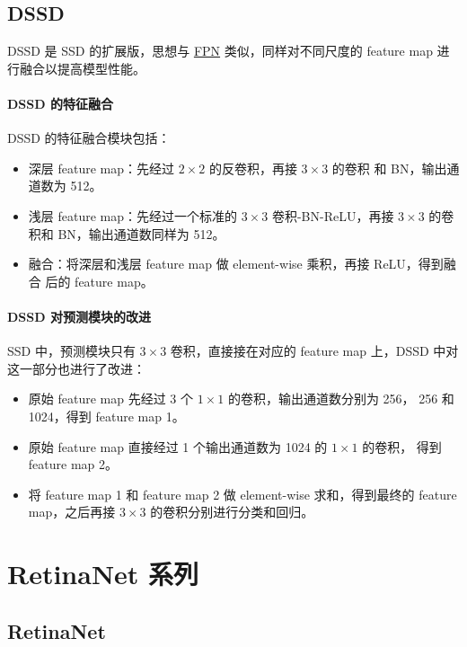 \subsection{DSSD}
\label{subsec:DSSD}

DSSD 是 SSD 的扩展版，思想与 \hyperref[sec:FPN]{FPN} 类似，同样对不同尺度的
feature map 进行融合以提高模型性能。

\paragraph{DSSD 的特征融合}
DSSD 的特征融合模块包括：

\begin{itemize}
  \item 深层 feature map：先经过 $2 \times 2$ 的反卷积，再接 $3 \times 3$ 的卷积
    和 BN，输出通道数为 512。
  \item 浅层 feature map：先经过一个标准的 $3 \times 3$ 卷积-BN-ReLU，再接 $3
    \times 3$ 的卷积和 BN，输出通道数同样为 512。
  \item 融合：将深层和浅层 feature map 做 element-wise 乘积，再接 ReLU，得到融合
    后的 feature map。
\end{itemize}

\paragraph{DSSD 对预测模块的改进}
SSD 中，预测模块只有 $3 \times 3$ 卷积，直接接在对应的 feature map 上，DSSD 中对
这一部分也进行了改进：

\begin{itemize}
  \item 原始 feature map 先经过 3 个 $1 \times 1$ 的卷积，输出通道数分别为 256，
    256 和 1024，得到 feature map 1。
  \item 原始 feature map 直接经过 1 个输出通道数为 1024 的 $1 \times 1$ 的卷积，
    得到 feature map 2。
  \item 将 feature map 1 和 feature map 2 做 element-wise 求和，得到最终的
    feature map，之后再接 $3 \times 3$ 的卷积分别进行分类和回归。
\end{itemize}

\section{RetinaNet 系列}

\subsection{RetinaNet}
\label{sub:RetinaNet}

